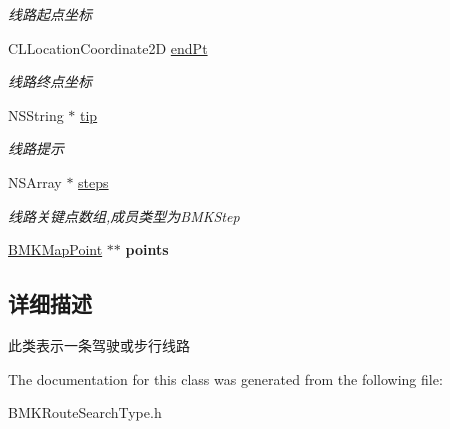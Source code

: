 \begin{DoxyCompactItemize}
\begin{DoxyCompactList}\small\item\em 线路起点坐标 \end{DoxyCompactList}\item 
\hypertarget{interface_b_m_k_route_ac101e8dce6365f04d68c3452ea28320a}{C\-L\-Location\-Coordinate2\-D \hyperlink{interface_b_m_k_route_ac101e8dce6365f04d68c3452ea28320a}{end\-Pt}}\label{interface_b_m_k_route_ac101e8dce6365f04d68c3452ea28320a}

\begin{DoxyCompactList}\small\item\em 线路终点坐标 \end{DoxyCompactList}\item 
\hypertarget{interface_b_m_k_route_a3ff9e9bae4c8c883298fe6280c74f109}{N\-S\-String $\ast$ \hyperlink{interface_b_m_k_route_a3ff9e9bae4c8c883298fe6280c74f109}{tip}}\label{interface_b_m_k_route_a3ff9e9bae4c8c883298fe6280c74f109}

\begin{DoxyCompactList}\small\item\em 线路提示 \end{DoxyCompactList}\item 
\hypertarget{interface_b_m_k_route_a2d7c6c1ffbf500845f8f95fc00c1cb4b}{N\-S\-Array $\ast$ \hyperlink{interface_b_m_k_route_a2d7c6c1ffbf500845f8f95fc00c1cb4b}{steps}}\label{interface_b_m_k_route_a2d7c6c1ffbf500845f8f95fc00c1cb4b}

\begin{DoxyCompactList}\small\item\em 线路关键点数组,成员类型为\-B\-M\-K\-Step \end{DoxyCompactList}\item 
\hypertarget{interface_b_m_k_route_a4af51d6046f075f27b3e3402147c785e}{\hyperlink{struct_b_m_k_map_point}{B\-M\-K\-Map\-Point} $\ast$$\ast$ {\bfseries points}}\label{interface_b_m_k_route_a4af51d6046f075f27b3e3402147c785e}

\end{DoxyCompactItemize}


\subsection{详细描述}
此类表示一条驾驶或步行线路 

The documentation for this class was generated from the following file\-:\begin{DoxyCompactItemize}
\item 
B\-M\-K\-Route\-Search\-Type.\-h\end{DoxyCompactItemize}
